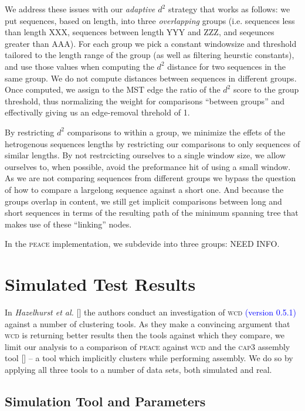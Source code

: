 \documentclass[a4paper,12pt]{article}
\newcommand{\mc}[1]{\textcolor{blue}{#1}}
\begin{document}
\begin{appendix}
We address these issues with our {\it adaptive $d^2$} strategy that
works as follows: we put sequences, based on length, into three {\it
  overlapping} groups (i.e. sequences less than length XXX, sequences
between length YYY and ZZZ, and seqeunces greater than AAA).  For each
group we pick a constant windowsize and threshold tailored to the
length range of the group (as well as filtering heurstic constants),
and use those values when computing the $d^2$ distance for two
sequences in the same group.  We do not compute distances between
sequences in different groups. Once computed, we assign to the MST
edge the ratio of the $d^2$ score to the group threshold, thus
normalizing the weight for comparisons ``between groups'' and
effectivally giving us an edge-removal threhold of 1.

By restricting $d^2$ comparisons to within a group, we minimize the
effets of the hetrogenous sequences lengths by restricting our
comparisons to only sequences of similar lengths.  By not restrcicting
ourselves to a single window size, we allow ourselves to, when possible, avoid the
preformance hit of using a small window.  As we are not comparing
sequences from different groups we bypass the question of how to
compare a largelong sequence against a short one.  And because the
groups overlap in content, we still get implicit comparisons between
long and short sequences in terms of the resulting path of the minimum
spanning tree that makes use of these ``linking'' nodes.

In the \textsc{peace} implementation, we subdevide into three groups:
NEED INFO.




\section{Simulated Test Results}

In {\it Hazelhurst et al.} [\cite{Hazelhurst08a}] the authors conduct
an investigation of \textsc{wcd} \mc{(version 0.5.1)} against a number of clustering
tools.  As they make a convincing argument that \textsc{wcd} is returning
better results then the tools against which they compare, we limit our
analysis to a comparison of \textsc{peace} against \textsc{wcd} and the \textsc{cap3} assembly
tool [\cite{Huang99}] -- a tool which implicitly clusters while
performing assembly.  We do so by applying all three tools to a number
of data sets, both simulated and real.

\subsection{Simulation Tool and Parameters}


\end{appendix}
\end{document}
